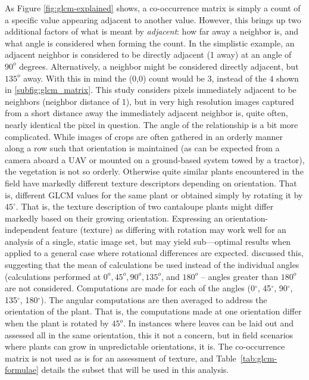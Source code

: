 \documentclass[letterpaper, notitlepage]{report}
\begin{document}
As Figure \ref{fig:glcm-explained} shows, a co-occurrence matrix is simply a count of a specific value appearing adjacent to another value. However, this brings up two additional factors of what is meant by \textit{adjacent}: how far away a neighbor is, and what angle is considered when forming the count. In the simplistic example, an adjacent neighbor is considered to be directly adjacent (1 away) at an angle of $90^o$ degrees. Alternatively, a neighbor might be considered directly adjacent, but $135^o$ away.  With this in mind the (0,0) count would be $3$, instead of the $4$ shown in \ref{subfig:glcm_matrix}. This study considers pixels immediately adjacent to be neighbors (neighbor distance of 1), but  in very high resolution images captured from a short distance away the immediately adjacent neighbor is, quite often, nearly identical the pixel in question. The angle of the relationship is a bit more complicated. While images of crops are often gathered in an orderly manner along a row such that orientation is maintained (as can be expected from a camera aboard a \gls{UAV} or mounted on a ground-based system towed by a tractor), the vegetation is not so orderly. Otherwise quite similar plants encountered in the field have markedly different texture descriptors depending on orientation. That is, different GLCM values for the same plant or obtained simply by rotating it by $45^{\circ}$. That is, the texture description of two cantaloupe plants might differ markedly based on their growing orientation. Expressing an orientation-independent feature (texture) as differing with rotation may work well for an analysis of a single, static image set, but may yield sub---optimal results when applied to a general case where rotational differences are expected. \citeauthor*{Haralick1973-gr} discussed this, suggesting that the mean of calculations be used instead of the individual angles (calculations performed at $0^o, 45^o, 90^o, 135^o$, and $180^o$ -- angles greater than $180^o$ are not considered. Computations are made for each of the angles (0$^{\circ}$, 45$^{\circ}$, 90$^{\circ}$, 135$^{\circ}$, 180$^{\circ}$). The angular computations are then averaged to address the orientation of the plant. That is, the computations made at one orientation differ when the plant is rotated by $45^o$. In instances where leaves can be laid out and assessed all in the same orientation, this it not a concern, but in field scenarios where plants can grow in unpredictable orientations, it is. The co-occurrence matrix is not used as is for an assessment of texture, and Table~\ref{tab:glcm-formulae} details the subset that will be used in this analysis.
\end{document}
